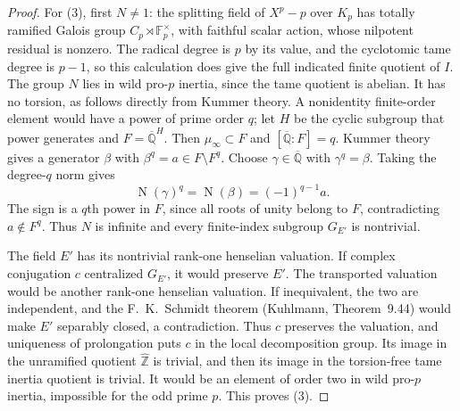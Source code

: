 \begin{proof}
For (3), first $N\ne1$: the splitting field of $X^p-p$ over
$K_p$ has totally ramified Galois group
$C_p\rtimes\mathbb F_p^\times$, with faithful scalar action,
whose nilpotent residual is nonzero.  The radical degree is $p$
by its value, and the cyclotomic tame degree is $p-1$, so this
calculation does give the full indicated finite quotient of $I$.
The group $N$ lies in wild pro-$p$ inertia, since the tame quotient
is abelian.  It has no torsion, as follows directly from Kummer
theory.  A nonidentity finite-order element would have a power of
prime order $q$; let $H$ be the cyclic subgroup that power generates
and $F=\overline{\mathbb Q}^{H}$.  Then $\mu_\infty\subset F$
and $[\overline{\mathbb Q}:F]=q$.  Kummer theory gives a generator
$\beta$ with $\beta^q=a\in F\setminus F^q$.
Choose $\gamma\in\overline{\mathbb Q}$ with $\gamma^q=\beta$.
Taking the degree-$q$ norm gives
\[
 \operatorname{N}(\gamma)^q
   =\operatorname{N}(\beta)=(-1)^{q-1}a.
\]
The sign is a $q$th power in $F$, since all roots of unity belong
to $F$, contradicting $a\notin F^q$.  Thus $N$ is infinite and
every finite-index subgroup $G_{E'}$ is nontrivial.

The field $E'$ has its nontrivial rank-one henselian valuation.  If
complex conjugation $c$ centralized $G_{E'}$, it would preserve
$E'$.  The transported valuation would be another rank-one henselian
valuation.  If inequivalent, the two are independent, and the
F.~K.~Schmidt theorem (Kuhlmann, Theorem~9.44) would make $E'$
separably closed, a contradiction.  Thus $c$ preserves the
valuation, and uniqueness of prolongation puts $c$ in the local
decomposition group.  Its image in the unramified quotient
$\widehat{\mathbb Z}$ is trivial, and then its image in the
torsion-free tame inertia quotient is trivial.  It would be an
element of order two in wild pro-$p$ inertia, impossible for the
odd prime $p$.  This proves (3).
\end{proof}

